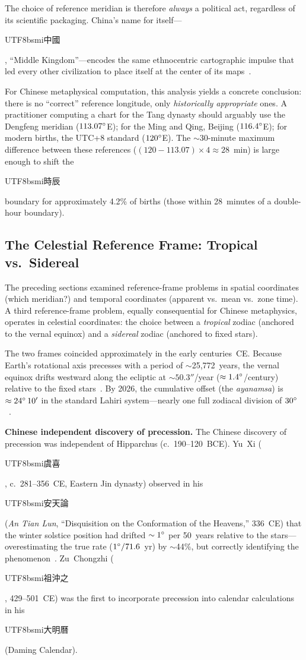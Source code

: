 \documentclass[10pt,a4paper]{article}
\newcommand{\zh}[1]{\begin{CJK}{UTF8}{bsmi}#1\end{CJK}}
\begin{document}
\noindent
The choice of reference meridian is therefore \emph{always} a political
act, regardless of its scientific packaging. China's name for
itself---\zh{中國}, ``Middle Kingdom''---encodes the same ethnocentric
cartographic impulse that led every other civilization to place itself
at the center of its maps~\cite{harley1987}.

For Chinese metaphysical computation, this analysis yields a concrete
conclusion: there is no ``correct'' reference longitude, only
\emph{historically appropriate} ones. A practitioner computing a chart for
the Tang dynasty should arguably use the Dengfeng meridian
($113.07\degree$E); for the Ming and Qing, Beijing ($116.4\degree$E);
for modern births, the UTC+8 standard ($120\degree$E). The $\sim 30$-minute
maximum difference between these references
($(120 - 113.07) \times 4 \approx 28$~min) is large enough to shift
the \zh{時辰} boundary for approximately 4.2\% of births
(those within 28~minutes of a double-hour boundary).

\subsection{The Celestial Reference Frame: Tropical vs.\ Sidereal}
\label{subsec:tropical_sidereal}

The preceding sections examined reference-frame problems in spatial
coordinates (which meridian?) and temporal coordinates (apparent vs.\
mean vs.\ zone time).  A third reference-frame problem, equally
consequential for Chinese metaphysics, operates in celestial
coordinates: the choice between a \emph{tropical} zodiac (anchored to
the vernal equinox) and a \emph{sidereal} zodiac (anchored to fixed
stars).

The two frames coincided approximately in the early centuries~CE.
Because Earth's rotational axis precesses with a period of
$\sim$25,772~years, the vernal equinox drifts westward along the
ecliptic at $\sim 50.3''$/year ($\approx 1.4\degree$/century) relative
to the fixed stars~\cite{needham1959}.  By 2026, the cumulative offset
(the \emph{ayanamsa}) is $\approx 24\degree\,10'$ in the standard
Lahiri system---nearly one full zodiacal division of
$30\degree$~\cite{chandra_hari_1998}.

\textbf{Chinese independent discovery of precession.}
The Chinese discovery of precession was independent of Hipparchus
(c.~190--120~BCE).  Yu~Xi (\zh{虞喜}, c.~281--356~CE, Eastern Jin
dynasty) observed in his \zh{安天論} (\textit{An Tian Lun},
``Disquisition on the Conformation of the Heavens,'' 336~CE) that the
winter solstice position had drifted $\sim 1\degree$ per 50~years
relative to the stars---overestimating the true rate
($1\degree/71.6$~yr) by $\sim$44\%, but correctly identifying the
phenomenon~\cite{needham1959, hockey_bea_2014}.  Zu~Chongzhi
(\zh{祖沖之}, 429--501~CE) was the first to incorporate precession into
calendar calculations in his \zh{大明曆} (Daming Calendar).
\end{document}
